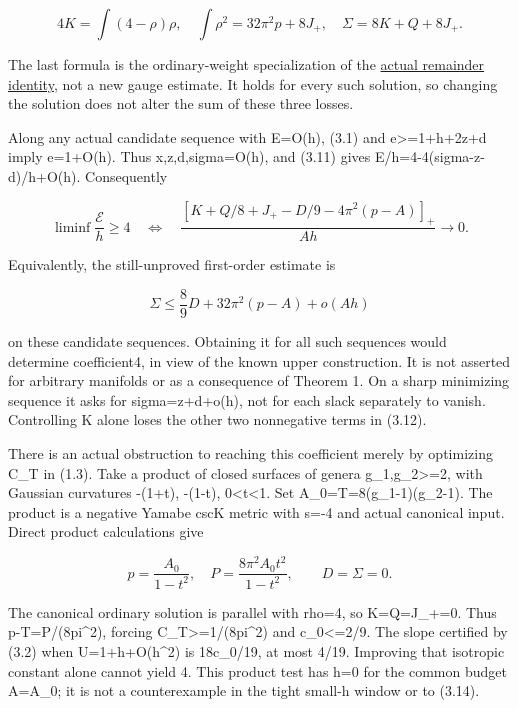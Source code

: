 \documentclass[
  10pt,
]{article}
\begin{document}
\[
 4K=\int(4-\rho)\rho,\quad
 \int\rho^2=32\pi^2p+8J_+,\quad
 \boxed{\Sigma=8K+Q+8J_+.}                             \tag{3.12}
\]

The last formula is the ordinary-weight specialization of the
\href{20260926_actual_topological_cost.md}{actual remainder identity},
not a new gauge estimate. It holds for every such solution, so changing
the solution does not alter the sum of these three losses.

Along any actual candidate sequence with E=O(h), (3.1) and
e\textgreater=1+h+2z+d imply e=1+O(h). Thus x,z,d,sigma=O(h), and (3.11)
gives E/h=4-4(sigma-z-d)/h+O(h). Consequently

\[
 \boxed{\liminf\frac{\mathcal E}{h}\ge4
 \quad\Longleftrightarrow\quad
 \frac{[K+Q/8+J_+-D/9-4\pi^2(p-A)]_+}{Ah}\longrightarrow0.}
                                                               \tag{3.13}
\]

Equivalently, the still-unproved first-order estimate is

\[
                 \Sigma\le\frac89D+32\pi^2(p-A)+o(Ah)
                                                               \tag{3.14}
\]

on these candidate sequences. Obtaining it for all such sequences would
determine coefficient4, in view of the known upper construction. It is
not asserted for arbitrary manifolds or as a consequence of Theorem 1.
On a sharp minimizing sequence it asks for sigma=z+d+o(h), not for each
slack separately to vanish. Controlling K alone loses the other two
nonnegative terms in (3.12).

There is an actual obstruction to reaching this coefficient merely by
optimizing C\_T in (1.3). Take a product of closed surfaces of genera
g\_1,g\_2\textgreater=2, with Gaussian curvatures -(1+t), -(1-t),
0\textless t\textless1. Set A\_0=T=8(g\_1-1)(g\_2-1). The product is a
negative Yamabe cscK metric with s=-4 and actual canonical input. Direct
product calculations give

\[
 p=\frac{A_0}{1-t^2},\quad
 P=\frac{8\pi^2 A_0t^2}{1-t^2},\qquad D=\Sigma=0.
                                                               \tag{3.15}
\]

The canonical ordinary solution is parallel with rho=4, so K=Q=J\_+=0.
Thus p-T=P/(8pi\^{}2), forcing C\_T\textgreater=1/(8pi\^{}2) and
c\_0\textless=2/9. The slope certified by (3.2) when U=1+h+O(h\^{}2) is
18c\_0/19, at most 4/19. Improving that isotropic constant alone cannot
yield 4. This product test has h=0 for the common budget A=A\_0; it is
not a counterexample in the tight small-h window or to (3.14).
\end{document}
